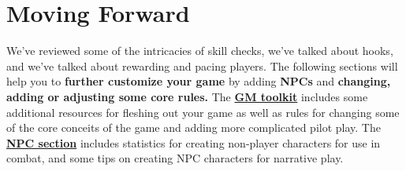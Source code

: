 \section{Moving Forward}

We've reviewed some of the intricacies of skill checks, we've talked about hooks, and we've
talked about rewarding and pacing players. The following sections will help you to \textbf{further
customize your game} by adding \textbf{NPCs} and \textbf{changing, adding or adjusting some core rules.}
The \hyperlink{GMToolkit}{\textbf{GM toolkit}} includes some additional resources for fleshing out your game as well as rules
for changing some of the core conceits of the game and adding more complicated pilot play. The
\hyperlink{NPCSection}{\textbf{NPC section}} includes statistics for creating non-player characters for use in combat, and some
tips on creating NPC characters for narrative play.

